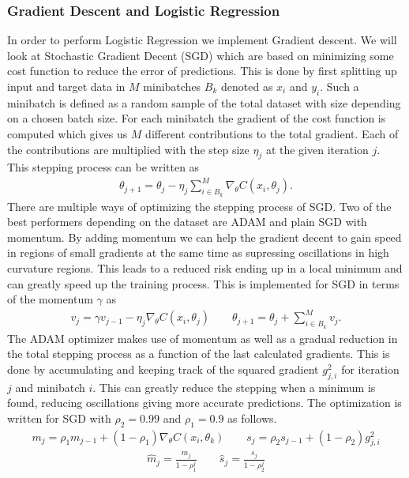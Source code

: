 \documentclass[11pt]{article}
\begin{document}
\subsubsection*{Gradient Descent and Logistic Regression}
In order to perform Logistic Regression we implement Gradient descent. We will look at Stochastic Gradient Decent (SGD) which are based on minimizing some cost function to reduce the error of predictions. This is done by first splitting up input and target data in $M$ minibatches $B_k$ denoted as $x_i$ and $y_i$. Such a minibatch is defined as a random sample of the total dataset with size depending on a chosen batch size. For each minibatch the gradient of the cost function is computed which gives us $M$ different contributions to the total gradient. Each of the contributions are multiplied with the step size $\eta_j$ at the given iteration $j$. This stepping process can be written as
\begin{align*}
    \theta_{j+1} = \theta_j - \eta_j \sum_{i \in B_k}^M \nabla_\theta C(x_i, \theta_j).
\end{align*}
There are multiple ways of optimizing the stepping process of SGD. Two of the best performers depending on the dataset are ADAM and plain SGD with momentum. By adding momentum we can help the gradient decent to gain speed in regions of small gradients at the same time as supressing oscillations in high curvature regions. This leads to a reduced risk ending up in a local minimum and can greatly speed up the training process. This is implemented for SGD in terms of the momentum $\gamma$ as
\begin{align*}
    v_j = \gamma v_{j-1}  - \eta_j \nabla_\theta C(x_i, \theta_j) \quad\quad \theta_{j+1} = \theta_j +  \sum_{i \in B_k}^Mv_j.
\end{align*}
The ADAM optimizer makes use of momentum as well as a gradual reduction in the total stepping process as a function of the last calculated gradients. This is done by accumulating and keeping track of the squared gradient $g_{j,i}^2$ for iteration $j$ and minibatch $i$. This can greatly reduce the stepping when a minimum is found, reducing oscillations giving more accurate predictions. The optimization is written for SGD with $\rho_2=0.99$ and $\rho_1=0.9$ as follows.
\begin{align*}
    m_j = \rho_1 m_{j-1} + (1-\rho_1)\nabla_\theta C(x_i, \theta_k) \quad\quad s_j = \rho_2 s_{j-1} + (1- \rho_2)g_{j,i}^2
\end{align*}
\begin{align*}
    \hat{m}_j = \frac{m_j }{1-\rho_1^{j}} \quad\quad \hat{s}_j = \frac{s_j }{1- \rho_2^{j}}
\end{align*}
\end{document}
